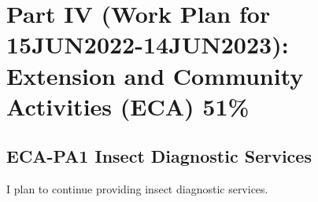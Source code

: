 %
%
%
%














\newpage
\section{Part IV (Work Plan for 15JUN2022-14JUN2023): Extension and Community Activities (ECA) 51\%}

\subsection{ECA-PA1 Insect Diagnostic Services} 
I plan to continue providing insect diagnostic services.

